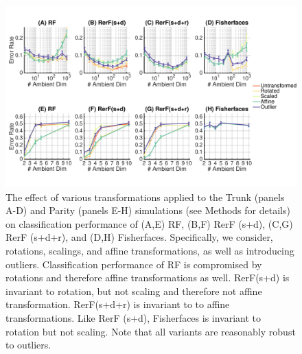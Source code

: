 \documentclass{article} %
\begin{document}
\begin{figure}[h]
\begin{center}
\includegraphics[trim=0in 0.9in 0in .09in, clip=true, width=\linewidth]{../Figures/pdf/Fig3_Invariance_v2}
\end{center}
\caption{The effect of various transformations applied to the Trunk (panels A-D) and Parity (panels E-H) simulations (see Methods for details) on classification performance of (A,E) RF, (B,F) RerF (s+d), (C,G) RerF (s+d+r), and (D,H) Fisherfaces. Specifically, we consider, rotations, scalings, and affine transformations, as well as introducing outliers. Classification performance of RF is compromised by rotations and therefore affine transformations as well. RerF(s+d) is invariant to rotation, but not scaling and therefore not affine transformation. RerF(s+d+r) is invariant to to affine transformations. Like RerF (s+d), Fisherfaces is invariant to rotation but not scaling. Note that all variants are reasonably robust to outliers.}
\end{figure}
\end{document}
